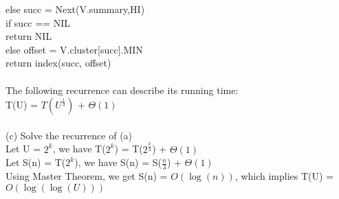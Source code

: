 \begin{problem}{5}
\tab\tab else succ = Next(V.summary,HI)\\
\tab\tab\tab if succ == NIL\\
\tab\tab\tab\tab return NIL\\
\tab\tab\tab else offset = V.cluster[succ].MIN\\
\tab\tab\tab\tab return index(succ, offset)\\
\\
\tab The following recurrence can describe its running time:\\
\tab\tab T(U) = $T({U}^{\frac{1}{3}})$ + $\Theta(1)$\\
\\
(c) Solve the recurrence of (a)\\
\tab Let U = ${2}^{k}$, we have T($2^{k}$) = T($2^{\frac{k}{3}}$) + $\Theta(1)$\\
\tab Let S(n) = T($2^{k}$), we have S(n) = S($\frac{n}{3}$) + $\Theta(1)$\\
Using Master Theorem, we get S(n) = $O(\log(n))$, which implies T(U) = $O(\log(\log(U)))$
\end{problem}